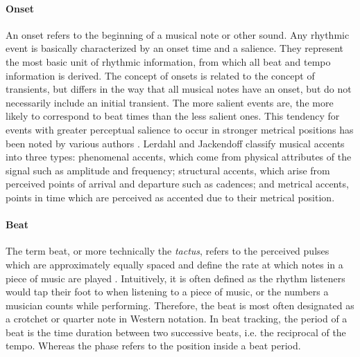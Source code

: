 \documentclass{scrartcl}
\begin{document}
\paragraph{Onset} 
An onset refers to the beginning of a musical note or other sound. Any rhythmic event is basically characterized by an onset time and a salience. They represent the most basic unit of rhythmic information, from which all beat and tempo information is derived. The concept of onsets is related to the concept of transients, but differs in the way that all musical notes have an onset, but do not necessarily include an initial transient. The more salient events are, the more likely to correspond to beat times than the less salient ones. This tendency for events with greater perceptual salience to occur in stronger metrical positions has been noted by various authors \cite{Lerdahl1985,Povel1985,Parncutt1994}. Lerdahl and Jackendoff \cite{Lerdahl1985} classify musical accents into three types: phenomenal accents, which come from physical attributes of the signal such as amplitude and frequency; structural accents, which arise from perceived points of arrival and departure such as cadences; and metrical accents, points in time which are perceived as accented due to their metrical position.


\paragraph{Beat} 
The term beat, or more technically the \emph{tactus}, refers to the perceived pulses which are approximately equally spaced and define the rate at which notes in a piece of music are played \cite{Handel1989}. Intuitively, it is often defined as the rhythm listeners would tap their foot to when listening to a piece of music, or the numbers a musician counts while performing. Therefore, the beat is most often designated as a crotchet or quarter note in Western notation. In beat tracking, the period of a beat is the time duration between two successive beats, i.e. the reciprocal of the tempo. Whereas the phase refers to the position inside a beat period.  


\end{document}
